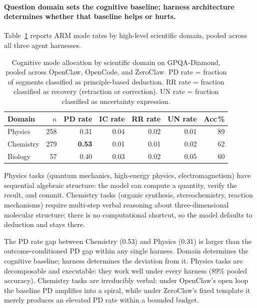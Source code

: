 \paragraph{Question domain sets the cognitive baseline; harness architecture
determines whether that baseline helps or hurts.}

Table~\ref{tab:arm-subdomain} reports ARM mode rates by high-level scientific
domain, pooled across all three agent harnesses.

\begin{table}[t]
\centering
\small
\caption{%
  Cognitive mode allocation by scientific domain on GPQA-Diamond, pooled
  across OpenClaw, OpenCode, and ZeroClaw.
  PD rate = fraction of segments classified as principle-based deduction.
  RR rate = fraction classified as recovery (retraction or correction).
  UN rate = fraction classified as uncertainty expression.
}
\label{tab:arm-subdomain}
\setlength{\tabcolsep}{4pt}
\begin{tabular}{lrrrrrr}
\toprule
Domain & $n$ & PD rate & IC rate & RR rate & UN rate & Acc\,\% \\
\midrule
Physics   & 258 & 0.31 & 0.04 & 0.02 & 0.01 & 89 \\
Chemistry & 279 & \textbf{0.53} & 0.01 & 0.01 & 0.02 & 62 \\
Biology   &  57 & 0.40 & 0.03 & 0.02 & 0.05 & 60 \\
\bottomrule
\end{tabular}
\end{table}


Physics tasks (quantum mechanics, high-energy physics, electromagnetism)
have sequential algebraic structure: the model can compute a quantity,
verify the result, and commit.
Chemistry tasks (organic synthesis, stereochemistry, reaction mechanisms)
require multi-step verbal reasoning about three-dimensional molecular
structure: there is no computational shortcut, so the model defaults to
deduction and stays there.

The PD rate gap between Chemistry (0.53) and Physics (0.31) is larger than
the outcome-conditioned PD gap within any single harness.
Domain determines the cognitive baseline; harness determines the deviation
from it.
Physics tasks are decomposable and executable: they work well under every
harness (89\% pooled accuracy).
Chemistry tasks are irreducibly verbal: under OpenClaw's open loop the
baseline PD amplifies into a spiral, while under ZeroClaw's fixed template
it merely produces an elevated PD rate within a bounded budget.

